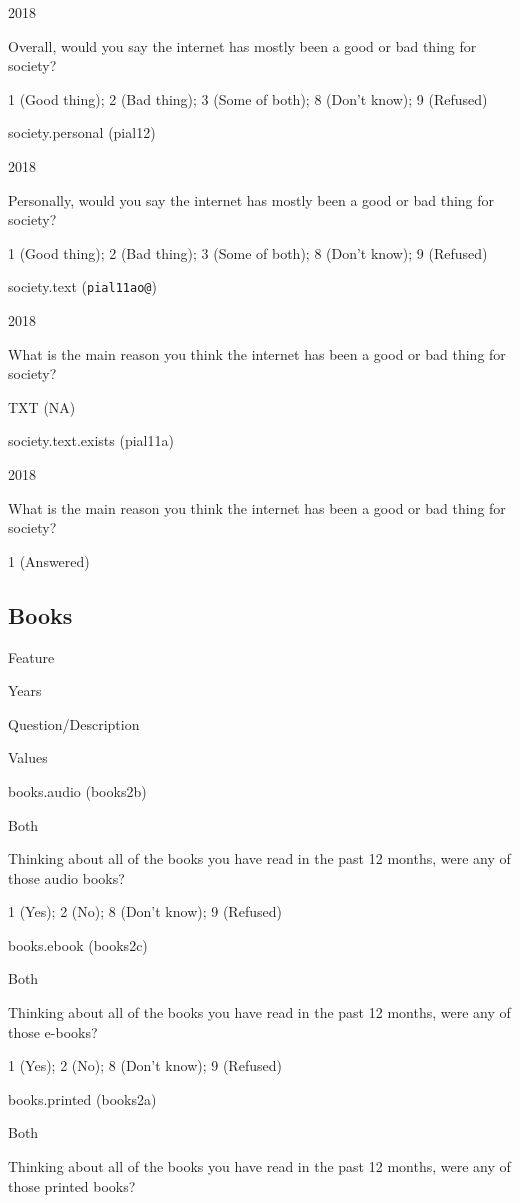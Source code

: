\documentclass[]{book}
\begin{document}
2018

Overall, would you say the internet has mostly been a good or bad thing
for society?

1 (Good thing); 2 (Bad thing); 3 (Some of both); 8 (Don't know); 9
(Refused)

society.personal (pial12)

2018

Personally, would you say the internet has mostly been a good or bad
thing for society?

1 (Good thing); 2 (Bad thing); 3 (Some of both); 8 (Don't know); 9
(Refused)

society.text (\texttt{pial11ao@})

2018

What is the main reason you think the internet has been a good or bad
thing for society?

TXT (NA)

society.text.exists (pial11a)

2018

What is the main reason you think the internet has been a good or bad
thing for society?

1 (Answered)

\subsection*{Books}\label{books}

Feature

Years

Question/Description

Values

books.audio (books2b)

Both

Thinking about all of the books you have read in the past 12 months,
were any of those audio books?

1 (Yes); 2 (No); 8 (Don't know); 9 (Refused)

books.ebook (books2c)

Both

Thinking about all of the books you have read in the past 12 months,
were any of those e-books?

1 (Yes); 2 (No); 8 (Don't know); 9 (Refused)

books.printed (books2a)

Both

Thinking about all of the books you have read in the past 12 months,
were any of those printed books?
\end{document}
